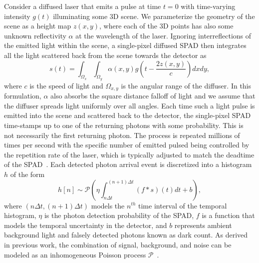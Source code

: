 Consider a diffused laser that emits a pulse at time $t = 0$ with time-varying intensity $g(t)$ illuminating some 3D scene. We parameterize the geometry of the scene as a height map $z(x, y)$, where each of the 3D points has also some unknown reflectivity $\alpha$ at the wavelength of the laser. Ignoring interreflections of the emitted light within the scene, a single-pixel diffused SPAD then integrates all the light scattered back from the scene towards the detector as
%
\begin{equation}
	s \left( t \right)= \int_{\Omega_x} \int_{\Omega_y} \alpha \left( x,y \right) g \left( t - \frac{2z(x,y)}{c} \right) dx dy ,
	\label{eq:pulse_integral} 
\end{equation}  
%
where $c$ is the speed of light and $\Omega_{x,y}$ is the angular range of the diffuser. In this formulation, $\alpha$ also absorbs the square distance falloff of light and we assume that the diffuser spreads light uniformly over all angles. Each time such a light pulse is emitted into the scene and scattered back to the detector, the single-pixel SPAD time-stamps up to one of the returning photons with some probability. This is not necessarily the first returning photon. The process is repeated millions of times per second with the specific number of emitted pulsed being controlled by the repetition rate of the laser, which is typically adjusted to match the deadtime of the SPAD~\cite{Heide:2018}. Each detected photon arrival event is discretized into a histogram $h$ of the form
%
\begin{equation}
  h[n] \sim \mathcal{P} \left( \eta \int_{n\Delta t}^{(n+1)\Delta t} \left(f * s \right) \left( t \right)  dt + b \right),	
	\label{eq:spad_measurements}
\end{equation}
%
where $(n\Delta t, (n+1) \Delta t)$ models the $n^{th}$ time interval of the temporal histogram, $\eta$ is the photon detection probability of the SPAD, $f$ is a function that models the temporal uncertainty in the detector, and $b$ represents ambient background light and falsely detected photons known as dark count. As derived in previous work, the combination of signal, background, and noise can be modeled as an inhomogeneous Poisson process $\mathcal{P}$~\cite{Kirmani:2014,Shin2015}.



